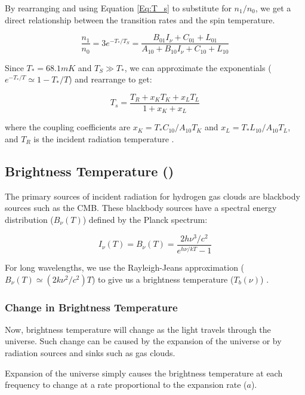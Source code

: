 By rearranging and using Equation \ref{Eq:T_s} to substitute for $n_1/n_0$, we get a direct relationship between the transition rates and the spin temperature. 

\begin{equation}
\frac{n_1}{n_0} = 3 e^{-T_*/T_S} = \frac{B_{01} I_\nu + C_{01}+ L_{01}}{A_{10}+ B_{10} I_\nu + C_{10} +L_{10}}
\end{equation}

Since $T_* = 68.1 mK$ and $T_S \gg T_*$, we can approximate the exponentials ($e^{-T_*/T} \simeq 1-T_*/T$) and rearrange to get:

\begin{equation}\label{Eq:dT_s}
T_s = \frac{T_{R} + x_K T_{K} + x_{L} T_{L}}{1+x_K +x_{L}}
\end{equation}

where the coupling coefficients are $x_K = T_* C_{10}/A_{10} T_K$ and $x_L = T_* L_{10} / A_{10} T_L$, and $T_R$ is the incident radiation temperature \cite{field_1958}.

\subsection{Brightness Temperature (\tb)}

The primary sources of incident radiation for hydrogen gas clouds are blackbody sources such as the CMB. These blackbody sources have a spectral energy distribution ($B_\nu (T)$) defined by the Planck spectrum:

\begin{equation}
I_{\nu} (T) = B_{\nu}(T) = \frac{ 2 h \nu^3 / c^2}{e^{h \nu / k T}-1}
\end{equation}

For long wavelengths, we use the Rayleigh-Jeans approximation ($B_{\nu} (T) \simeq (2 k \nu^2 / c^2) T$) to give us a brightness temperature ($T_b (\nu)$) \cite{carroll2007}. 

\subsubsection{Change in Brightness Temperature}

Now, brightness temperature will change as the light travels through the universe. Such change can be caused by the expansion of the universe or by radiation sources and sinks such as gas clouds. 

Expansion of the universe simply causes the brightness temperature at each frequency to change at a rate proportional to the expansion rate ($a$). 

